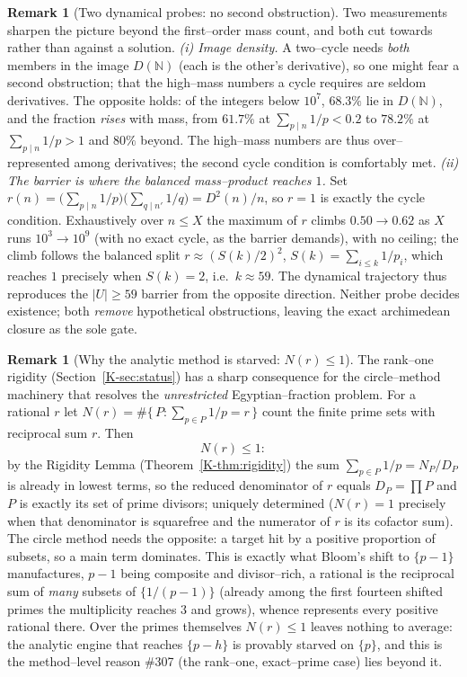 \documentclass[11pt]{article}
\theoremstyle{definition}
\newtheorem{remark}[theorem]{Remark}
\begin{document}
\begin{remark}[Two dynamical probes: no second obstruction]\label{rem:dynamical}
Two measurements sharpen the picture beyond the first--order mass count, and both cut towards rather
than against a solution. \emph{(i) Image density.} A two--cycle needs \emph{both} members in the image
$D(\mathbb{N})$ (each is the other's derivative), so one might fear a second obstruction; that the
high--mass numbers a cycle requires are seldom derivatives. The opposite holds: of the integers below
$10^7$, $68.3\%$ lie in $D(\mathbb{N})$, and the fraction \emph{rises} with mass, from $61.7\%$ at
$\sum_{p\mid n}1/p<0.2$ to $78.2\%$ at $\sum_{p\mid n}1/p>1$ and $80\%$ beyond. The high--mass numbers
are thus over--represented among derivatives; the second cycle condition is comfortably met.
\emph{(ii) The barrier is where the balanced mass--product reaches $1$.} Set
$r(n)=\bigl(\sum_{p\mid n}1/p\bigr)\bigl(\sum_{q\mid n'}1/q\bigr)=D^2(n)/n$, so $r=1$ is exactly the
cycle condition. Exhaustively over $n\le X$ the maximum of $r$ climbs $0.50\to0.62$ as $X$ runs
$10^3\to10^9$ (with no exact cycle, as the barrier demands), with no ceiling; the climb follows the
balanced split $r\approx(S(k)/2)^2$, $S(k)=\sum_{i\le k}1/p_i$, which reaches $1$ precisely when
$S(k)=2$, i.e.\ $k\approx59$. The dynamical trajectory thus reproduces the $|U|\ge59$ barrier from the
opposite direction. Neither probe decides existence; both \emph{remove} hypothetical obstructions,
leaving the exact archimedean closure as the sole gate.
\end{remark}

\begin{remark}[Why the analytic method is starved: $N(r)\le1$]\label{rem:nostructure}
The rank--one rigidity (Section~\ref{K-sec:status}) has a sharp consequence for the circle--method
machinery that resolves the \emph{unrestricted} Egyptian--fraction problem. For a rational $r$ let
$N(r)=\#\{\,P:\sum_{p\in P}1/p=r\,\}$ count the finite prime sets with reciprocal sum $r$. Then
\[N(r)\le1:\]
by the Rigidity Lemma (Theorem~\ref{K-thm:rigidity}) the sum $\sum_{p\in P}1/p=N_P/D_P$ is already in
lowest terms, so the reduced denominator of $r$ equals $D_P=\prod P$ and $P$ is exactly its set of
prime divisors; uniquely determined ($N(r)=1$ precisely when that denominator is squarefree and the
numerator of $r$ is its cofactor sum). The circle method needs the opposite: a target hit by a positive
proportion of subsets, so a main term dominates. This is exactly what Bloom's shift to $\{p-1\}$
manufactures, $p-1$ being composite and divisor--rich, a rational is the reciprocal sum of
\emph{many} subsets of $\{1/(p-1)\}$ (already among the first fourteen shifted primes the multiplicity
reaches $3$ and grows), whence \cite{BloomShifted} represents every positive rational there. Over the
primes themselves $N(r)\le1$ leaves nothing to average: the analytic engine that reaches $\{p-h\}$ is
provably starved on $\{p\}$, and this is the method--level reason \#307 (the rank--one, exact--prime
case) lies beyond it.
\end{remark}
\end{document}
